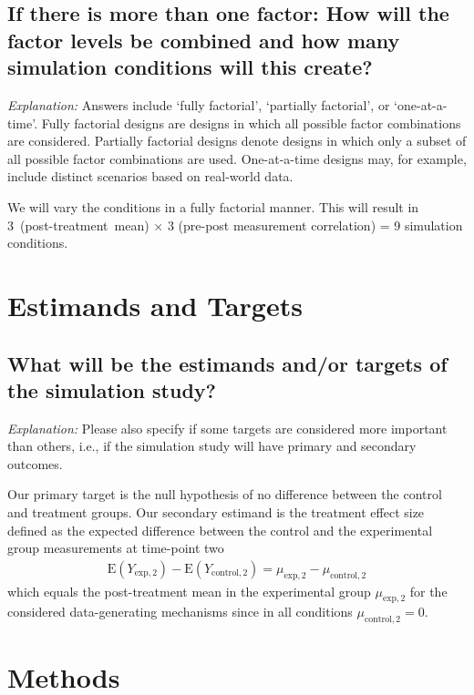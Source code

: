 \documentclass[12pt]{article}
\begin{document}
\subsection{If there is more than one factor: How will the factor levels be combined and how many simulation conditions will this create?}
\textit{Explanation:}  Answers include `fully factorial', `partially factorial', or `one-at-a-time'. Fully factorial designs are designs in which all possible factor combinations are considered. Partially factorial designs denote designs in which only a subset of all possible factor combinations are used. One-at-a-time designs may, for example, include distinct scenarios based on real-world data.

\begin{examplebox}
We will vary the conditions in a fully factorial manner. This will result in \mbox{3 (post-treatment mean)} $\times$ 3 (pre-post measurement correlation) = 9 simulation conditions.
\end{examplebox}


\section{Estimands and Targets}
\subsection{What will be the estimands and/or targets of the simulation study?}
\textit{Explanation:} Please also specify if some targets are considered more important than others, i.e., if the simulation study will have primary and secondary outcomes.

\begin{examplebox}
Our primary target is the null hypothesis of no difference between the control and treatment groups. Our secondary estimand is the treatment effect size defined as the expected difference between the control and the experimental group measurements at time-point two
\begin{align*}
    \text{E}(Y_{\text{exp},2}) - \text{E}(Y_{\text{control},2}) = \mu_{\text{exp},2} - \mu_{\text{control},2}
\end{align*}
which equals the post-treatment mean in the experimental group $\mu_{\text{exp},2}$ for the considered data-generating mechanisms since in all conditions $\mu_{\text{control},2} = 0$.
\end{examplebox}




\section{Methods}
\end{document}
